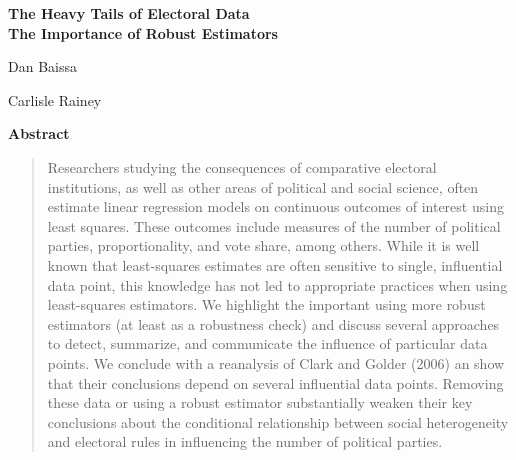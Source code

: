 \documentclass[12pt]{article}
\begin{document}
\begin{center}
{\LARGE \textbf{The Heavy Tails of Electoral Data}}\\\vspace{2mm}
{ \textbf{The Importance of Robust Estimators}}\\\vspace{2mm}


\vspace{10mm}

Dan Baissa

\vspace{3mm}

Carlisle Rainey
\end{center}

\vspace{10mm}

{\centerline{\textbf{Abstract}}}
\begin{quote}\noindent
Researchers studying the consequences of comparative electoral institutions, as well as other areas of political and social science, often estimate linear regression models on continuous outcomes of interest using least squares. These outcomes include measures of the number of political parties, proportionality, and vote share, among others. While it is well known that least-squares estimates are often sensitive to single, influential data point, this knowledge has not led to appropriate practices when using least-squares estimators. We highlight the important using more robust estimators (at least as a robustness check) and discuss several approaches to detect, summarize, and communicate the influence of particular data points. We conclude with a reanalysis of Clark and Golder (2006) an show that their conclusions depend on several influential data points. Removing these data or using a robust estimator substantially weaken their key conclusions about the conditional relationship between social heterogeneity and electoral rules in influencing the number of political parties.
 \end{quote}
\end{document}
